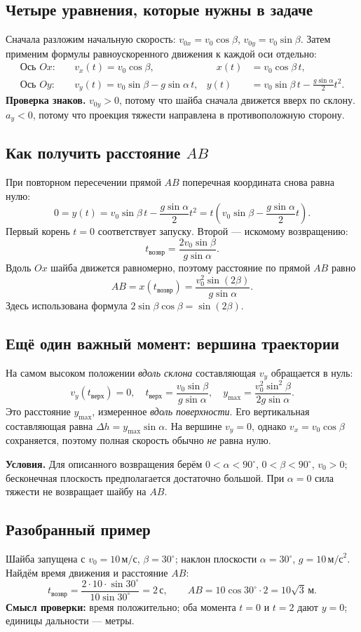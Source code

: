 \documentclass[a4paper,12pt]{article}
\newcommand{\key}[1]{\textcolor{darkaccent}{\textbf{#1}}}
\newcommand{\smallhead}[1]{\subsection*{\textcolor{darkaccent}{#1}}}
\begin{document}
\smallhead{Четыре уравнения, которые нужны в задаче}
Сначала разложим начальную скорость: \(v_{0x}=v_0\cos\beta\), \(v_{0y}=v_0\sin\beta\). Затем применим формулы равноускоренного движения к каждой оси отдельно:
\[
\begin{aligned}
\text{Ось }Ox:\quad &v_x(t)=v_0\cos\beta,&\quad x(t)&=v_0\cos\beta\,t,\\[3pt]
\text{Ось }Oy:\quad &v_y(t)=v_0\sin\beta-g\sin\alpha\,t,&
 y(t)&=v_0\sin\beta\,t-\frac{g\sin\alpha}{2}t^2.
\end{aligned}
\]
\key{Проверка знаков.} \(v_{0y}>0\), потому что шайба сначала движется вверх по склону. \(a_y<0\), потому что проекция тяжести направлена в противоположную сторону.

\smallhead{Как получить расстояние \(AB\)}
При повторном пересечении прямой \(AB\) поперечная координата снова равна нулю:
\[
0=y(t)=v_0\sin\beta\,t-\frac{g\sin\alpha}{2}t^2
=t\left(v_0\sin\beta-\frac{g\sin\alpha}{2}t\right).
\]
Первый корень \(t=0\) соответствует запуску. Второй --- искомому возвращению:
\[
\boxed{t_{\text{возвр}}=\frac{2v_0\sin\beta}{g\sin\alpha}.}
\]
Вдоль \(Ox\) шайба движется равномерно, поэтому расстояние по прямой \(AB\) равно
\[
\boxed{AB=x(t_{\text{возвр}})=\frac{v_0^2\sin(2\beta)}{g\sin\alpha}.}
\]
Здесь использована формула \(2\sin\beta\cos\beta=\sin(2\beta)\).

\smallhead{Ещё один важный момент: вершина траектории}
На самом высоком положении \emph{вдоль склона} составляющая \(v_y\) обращается в нуль:
\[
 v_y(t_{\text{верх}})=0,\quad
 t_{\text{верх}}=\frac{v_0\sin\beta}{g\sin\alpha},\quad
 y_{\max}=\frac{v_0^2\sin^2\beta}{2g\sin\alpha}.
\]
Это расстояние \(y_{\max}\), измеренное \emph{вдоль поверхности}. Его вертикальная составляющая равна \(\Delta h=y_{\max}\sin\alpha\). На вершине \(v_y=0\), однако \(v_x=v_0\cos\beta\) сохраняется, поэтому полная скорость обычно \emph{не} равна нулю.

\textbf{Условия.} Для описанного возвращения берём \(0<\alpha<90^\circ\), \(0<\beta<90^\circ\), \(v_0>0\); бесконечная плоскость предполагается достаточно большой. При \(\alpha=0\) сила тяжести не возвращает шайбу на \(AB\).

\smallhead{Разобранный пример}
Шайба запущена с \(v_0=10\,\text{м/с}\), \(\beta=30^\circ\); наклон плоскости \(\alpha=30^\circ\), \(g=10\,\text{м/с}^2\). Найдём время движения и расстояние \(AB\):
\[
 t_{\text{возвр}}=\frac{2\cdot10\cdot\sin30^\circ}{10\sin30^\circ}=2\,\text{с},\qquad
 AB=10\cos30^\circ\cdot2=10\sqrt3\,\text{м}.
\]
\key{Смысл проверки:} время положительно; оба момента \(t=0\) и \(t=2\) дают \(y=0\); единицы дальности --- метры.
\end{document}
